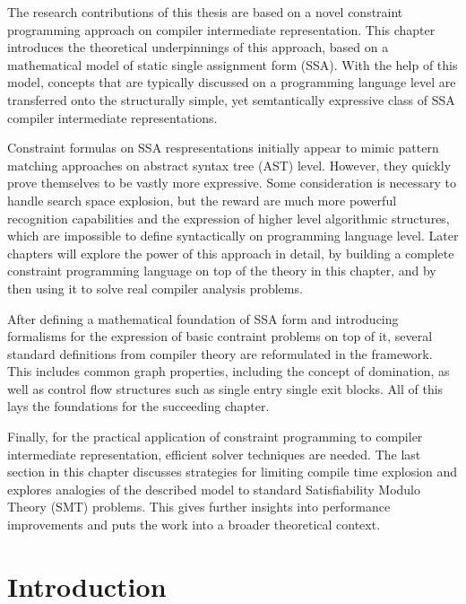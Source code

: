 
    The research contributions of this thesis are based on a novel constraint
    programming approach on compiler intermediate representation.
    This chapter introduces the theoretical underpinnings of this approach,
    based on a mathematical model of static single assignment form (SSA).
    With the help of this model, concepts that are typically discussed on a
    programming language level are transferred onto the structurally simple,
    yet semtantically expressive class of SSA compiler intermediate
    representations.

    Constraint formulas on SSA respresentations initially appear to mimic
    pattern matching approaches on abstract syntax tree (AST) level.
    However, they quickly prove themselves to be vastly more expressive.
    Some consideration is necessary to handle search space explosion, but
    the reward are much more powerful recognition capabilities and the
    expression of higher level algorithmic structures, which are impossible to
    define syntactically on programming language level.
    Later chapters will explore the power of this approach in detail, by
    building a complete constraint programming language on top of the theory in
    this chapter, and by then using it to solve real compiler analysis problems.

    After defining a mathematical foundation of SSA form and introducing
    formalisms for the expression of basic contraint problems on top of it,
    several standard definitions from compiler theory are reformulated in the
    framework.
    This includes common graph properties, including the concept of domination,
    as well as control flow structures such as single entry single exit blocks.
    All of this lays the foundations for the succeeding chapter.

    Finally, for the practical application of constraint programming to compiler
    intermediate representation, efficient solver techniques are needed.
    The last section in this chapter discusses strategies for limiting
    compile time explosion and explores analogies of the described model to
    standard Satisfiability Modulo Theory (SMT) problems.
    This gives further insights into performance improvements and puts the
    work into a broader theoretical context.

\section{Introduction}

